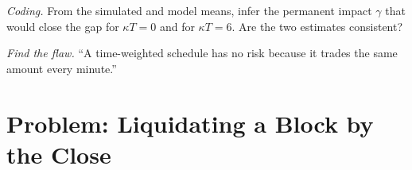 \begin{exercise}[$\star\star\star$]\label{exo:mx:the-almgren-chriss-framework:7}
\emph{Coding.} From the simulated and model means, infer the permanent impact $\gamma$ that would close the gap for $\kappa T=0$ and for $\kappa T=6$. Are the
two estimates consistent?
\end{exercise}

\begin{exercise}[$\star\star\star$]\label{exo:mx:the-almgren-chriss-framework:8}
\emph{Find the flaw.} ``A time-weighted schedule has no risk because it trades the same amount every minute.''
\end{exercise}

\section{Problem: Liquidating a Block by the Close}

